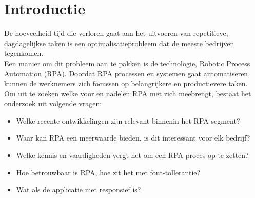 
\section{Introductie} %
\label{sec:introductie}
De hoeveelheid tijd die verloren gaat aan het uitvoeren van repetitieve, dagdagelijkse taken is een optimalisatieprobleem dat de meeste bedrijven tegenkomen. \\
Een manier om dit probleem aan te pakken is de technologie, Robotic Process Automation (RPA). Doordat RPA processen en systemen gaat automatiseren, kunnen de werknemers zich focussen op belangrijkere en productievere taken.\\
 Om uit te zoeken welke voor en nadelen RPA met zich meebrengt, bestaat het onderzoek uit volgende vragen:
\begin{itemize}
	\item Welke recente ontwikkelingen zijn relevant binnenin het RPA segment? 
	\item Waar kan RPA een meerwaarde bieden, is dit interessant voor elk bedrijf?
	\item Welke kennis en vaardigheden vergt het om een RPA proces op te zetten?
	\item Hoe betrouwbaar is RPA, hoe zit het met fout-tollerantie?
	\item Wat als de applicatie niet responsief is?
\end{itemize}




